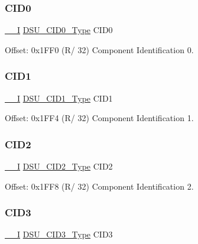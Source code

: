 \mbox{\label{struct_dsu_a16e039fe0232f95c8dc7919b2542dd48}} 
\subsubsection{\texorpdfstring{CID0}{CID0}}
{\footnotesize\ttfamily \mbox{\hyperlink{core__cm0plus_8h_af63697ed9952cc71e1225efe205f6cd3}{\+\_\+\+\_\+I}} \mbox{\hyperlink{union_d_s_u___c_i_d0___type}{D\+S\+U\+\_\+\+C\+I\+D0\+\_\+\+Type}} C\+I\+D0}



Offset\+: 0x1\+F\+F0 (R/ 32) Component Identification 0. 

\mbox{\label{struct_dsu_a4f595fd177580b2c838f8844c314f245}} 
\subsubsection{\texorpdfstring{CID1}{CID1}}
{\footnotesize\ttfamily \mbox{\hyperlink{core__cm0plus_8h_af63697ed9952cc71e1225efe205f6cd3}{\+\_\+\+\_\+I}} \mbox{\hyperlink{union_d_s_u___c_i_d1___type}{D\+S\+U\+\_\+\+C\+I\+D1\+\_\+\+Type}} C\+I\+D1}



Offset\+: 0x1\+F\+F4 (R/ 32) Component Identification 1. 

\mbox{\label{struct_dsu_ab082e3d3bf264bc5403f0c11dde2fa5e}} 
\subsubsection{\texorpdfstring{CID2}{CID2}}
{\footnotesize\ttfamily \mbox{\hyperlink{core__cm0plus_8h_af63697ed9952cc71e1225efe205f6cd3}{\+\_\+\+\_\+I}} \mbox{\hyperlink{union_d_s_u___c_i_d2___type}{D\+S\+U\+\_\+\+C\+I\+D2\+\_\+\+Type}} C\+I\+D2}



Offset\+: 0x1\+F\+F8 (R/ 32) Component Identification 2. 

\mbox{\label{struct_dsu_a8c297f52f243379755caaea53904ec8c}} 
\subsubsection{\texorpdfstring{CID3}{CID3}}
{\footnotesize\ttfamily \mbox{\hyperlink{core__cm0plus_8h_af63697ed9952cc71e1225efe205f6cd3}{\+\_\+\+\_\+I}} \mbox{\hyperlink{union_d_s_u___c_i_d3___type}{D\+S\+U\+\_\+\+C\+I\+D3\+\_\+\+Type}} C\+I\+D3}



